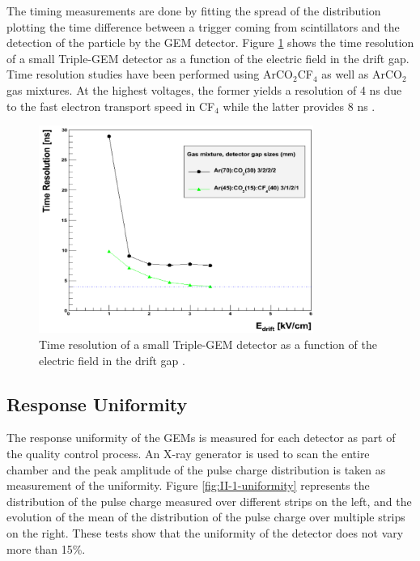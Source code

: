       The timing measurements are done by fitting the spread of the distribution plotting the time difference between a trigger coming from scintillators and the detection of the particle by the GEM detector. Figure \ref{fig:II-1-time-res} shows the time resolution of a small Triple-GEM detector as a function of the electric field in the drift gap. Time resolution studies have been performed using ArCO$_2$CF$_4$ as well as ArCO$_2$ gas mixtures. At the highest voltages, the former yields a resolution of 4 ns due to the fast electron transport speed in CF$_4$ while the latter provides 8 ns \cite{Thierry:2065693}. \\

      \begin{figure}[t!]
        \centering
        \includegraphics[width=0.8\textwidth]{img/II-1-gem/time-resolution.png}
        \caption{Time resolution of a small Triple-GEM detector as a function of the electric field in the drift gap \cite{Thierry:2065693}.}
        \label{fig:II-1-time-res}
      \end{figure}

    \subsection{Response Uniformity}

      The response uniformity of the GEMs is measured for each detector as part of the quality control process. An X-ray generator is used to scan the entire chamber and the peak amplitude of the pulse charge distribution is taken as measurement of the uniformity. Figure \ref{fig:II-1-uniformity} represents the distribution of the pulse charge measured over different strips on the left, and the evolution of the mean of the distribution of the pulse charge over multiple strips on the right. These tests show that the uniformity of the detector does not vary more than 15\%.

